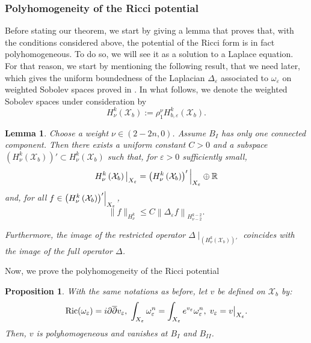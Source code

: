 \documentclass[a4paper,11pt]{article}
\newcounter{mythm}[section]
\newtheorem{lm}[mythm]{Lemma}
\newtheorem{pr}[mythm]{Proposition}
\newcommand\restr[2]{{%
  \left.\kern-\nulldelimiterspace %
  #1 %
  \littletaller %
  \right|_{#2} %
  }}
\newcommand{\littletaller}{\mathchoice{\vphantom{\big|}}{}{}{}}
\begin{document}
    \subsubsection{Polyhomogeneity of the Ricci potential}
    Before stating our theorem, we start by giving a lemma that proves that, with the conditions considered above, the potential of the Ricci form is in fact polyhomogeneous. To do so, we will see it as a solution to a Laplace equation.  For that reason, we start by mentioning the following result, that we need later, which gives the uniform boundedness of the Laplacian $\Delta_\varepsilon$ associated to $\omega_\varepsilon$ on weighted Sobolev spaces proved in \cite[Theorem 12.3]{pacini_desingularizing_2013}. In what follows, we denote the weighted Sobolev spaces under consideration by 
    $$H_{\nu}^k (\mathcal{X}_b) := \rho_1^{\nu}H_{b, \varepsilon}^k(\mathcal{X}_b).$$
\begin{lm} \label{lmunf}
Choose a weight $\nu \in(2-2n, 0)$. Assume $B_{I}$ has only one connected component. Then there exists a uniform constant $C>0$ and a subspace $\left(H_{ \nu}^k\left(\mathcal{X}_b\right) \right)' \subset H_{ \nu}^k\left(\mathcal{X}_b\right)$ such that, for $\varepsilon >0$ sufficiently small,
$$
\restr{H_{ \nu}^k\left(\mathcal{X}_b\right)}{X_\varepsilon}= \restr{\left(H_{ \nu}^k\left(\mathcal{X}_b\right) \right)'}{X_\varepsilon} \oplus \mathbb{R}
$$
and, for all $f \in \restr{\left(H_{ \nu}^k\left(\mathcal{X}_b\right) \right)'}{X_\varepsilon}$,
$$
\|f\|_{H_{\nu}^k} \leq C\left\|\Delta_{ \varepsilon} f\right\|_{H_{\nu -2 }^{k-2}} .
$$

Furthermore, the image of the restricted operator $\Delta \mid_{\left(H_{ \nu}^k\left(\mathcal{X}_b\right) \right)'}$ coincides with the image of the full operator $\Delta$.
\end{lm}
 Now, we prove the polyhomogeneity of the Ricci potential
 
     \begin{pr} \label{ricpot}
         With the same notations as before, let $v$ be defined on $\mathcal{X}_b$ by: 
    $$
    \mathrm{Ric} (\omega_\varepsilon) =  i \partial \overline{\partial}v_\varepsilon, \hspace{0.1cm} \int_{X_\varepsilon} \omega_\varepsilon^n = \int_{X_\varepsilon} e^{v_\varepsilon} \omega_\varepsilon^{n}, \hspace{0.1cm} v_\varepsilon = \restr{v}{X_\varepsilon}.
    $$ 
    Then, $v$ is polyhomogeneous and vanishes at $B_{I}$ and $B_{II}$. 
     \end{pr}
     
\end{document}
